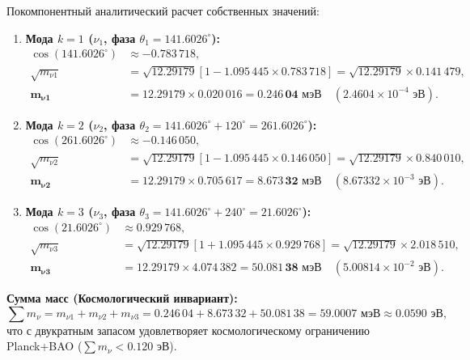 \documentclass[11pt,a4paper]{article}
\theoremstyle{definition}
\theoremstyle{remark}
\begin{document}
Покомпонентный аналитический расчет собственных значений:
\begin{enumerate}
	\item \textbf{Мода $k=1$ ($\nu_1$, фаза $\theta_1 = 141.6026^\circ$):}
	\begin{align}
		\cos(141.6026^\circ) &\approx -0.783\,718, \\
		\sqrt{m_{\nu 1}} &= \sqrt{12.29179} \left[ 1 - 1.095\,445 \times 0.783\,718 \right] = \sqrt{12.29179} \times 0.141\,479, \\
		\mathbf{m_{\nu 1}} &= 12.29179 \times 0.020\,016 = \mathbf{0.246\,04 \text{ мэВ}} \quad (2.4604 \times 10^{-4} \text{ эВ}).
	\end{align}
	\item \textbf{Мода $k=2$ ($\nu_2$, фаза $\theta_2 = 141.6026^\circ + 120^\circ = 261.6026^\circ$):}
	\begin{align}
		\cos(261.6026^\circ) &\approx -0.146\,050, \\
		\sqrt{m_{\nu 2}} &= \sqrt{12.29179} \left[ 1 - 1.095\,445 \times 0.146\,050 \right] = \sqrt{12.29179} \times 0.840\,010, \\
		\mathbf{m_{\nu 2}} &= 12.29179 \times 0.705\,617 = \mathbf{8.673\,32 \text{ мэВ}} \quad (8.67332 \times 10^{-3} \text{ эВ}).
	\end{align}
	\item \textbf{Мода $k=3$ ($\nu_3$, фаза $\theta_3 = 141.6026^\circ + 240^\circ = 21.6026^\circ$):}
	\begin{align}
		\cos(21.6026^\circ) &\approx 0.929\,768, \\
		\sqrt{m_{\nu 3}} &= \sqrt{12.29179} \left[ 1 + 1.095\,445 \times 0.929\,768 \right] = \sqrt{12.29179} \times 2.018\,510, \\
		\mathbf{m_{\nu 3}} &= 12.29179 \times 4.074\,382 = \mathbf{50.081\,38 \text{ мэВ}} \quad (5.00814 \times 10^{-2} \text{ эВ}).
	\end{align}
\end{enumerate}

\textbf{Сумма масс (Космологический инвариант):}
\begin{equation}
	\sum m_\nu = m_{\nu 1} + m_{\nu 2} + m_{\nu 3} = 0.246\,04 + 8.673\,32 + 50.081\,38 = \mathbf{59.0007 \text{ мэВ}} \approx \mathbf{0.0590 \text{ эВ}},
\end{equation}
что с двукратным запасом удовлетворяет космологическому ограничению Planck+BAO ($\sum m_\nu < 0.120$ эВ).
\end{document}

